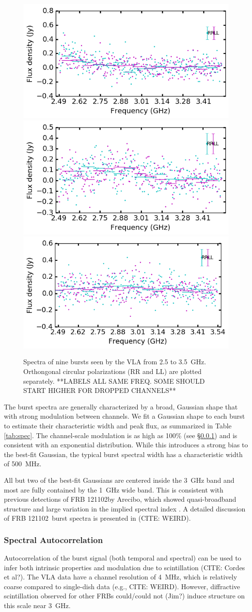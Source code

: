 \documentclass[twocolumn]{aastex61}
\newcommand{\frb}{FRB 121102}
\begin{document}
\begin{figure}[h!]
\begin{center}
 \begin{minipage}{2\columnwidth}
  \includegraphics[width=0.3\columnwidth]{spec_57646.png}
  \includegraphics[width=0.3\columnwidth]{spec_57648.png}
  \includegraphics[width=0.3\columnwidth]{spec_57649.png}
 \end{minipage}
\caption{Spectra of nine bursts seen by the VLA from 2.5 to 3.5~GHz. Orthongonal circular polarizations (RR and LL) are plotted separately. **LABELS ALL SAME FREQ. SOME SHOULD START HIGHER FOR DROPPED CHANNELS**
\label{fig:spec}}
\end{center}
\end{figure}

The burst spectra are generally characterized by a broad, Gaussian shape that with strong modulation between channels. We fit a Gaussian shape to each burst to estimate their characteristic width and peak flux, as summarized in Table \ref{tab:spec}. The channel-scale modulation is as high as 100\% (see \S \ref{sec:auto}) and is consistent with an exponential distribution. While this introduces a strong bias to the best-fit Gaussian, the typical burst spectral width has a characteristic width of 500~MHz.

All but two of the best-fit Gaussians are centered inside the 3~GHz band and most are fully contained by the 1~GHz wide band. This is consistent with previous detections of \frb by Arecibo, which showed quasi-broadband structure \citep{2016arXiv160308880S} and large variation in the implied spectral index \citep{2014ApJ...790..101S}. A detailed discussion of \frb\ burst spectra is presented in (CITE: WEIRD).

\subsubsection{Spectral Autocorrelation}
\label{sec:auto}
Autocorrelation of the burst signal (both temporal and spectral) can be used to infer both intrinsic properties and modulation due to scintillation (CITE: Cordes et al?). The VLA data have a channel resolution of 4~MHz, which is relatively coarse compared to single-dish data (e.g., CITE: WEIRD). However, diffractive scintillation observed for other FRBs \citep{} {\color{red}could/could not (Jim?)} induce structure on this scale near 3~GHz.
\end{document}

